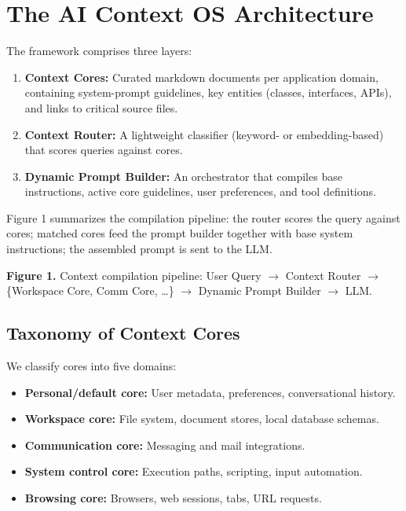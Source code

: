 \documentclass[11pt]{article}
\providecommand{\tightlist}{%
  \setlength{\itemsep}{2pt}%
  \setlength{\parskip}{0pt}%
}
\begin{document}
\section{The AI Context OS
Architecture}\label{the-ai-context-os-architecture}

The framework comprises three layers:

\begin{enumerate}
\def\labelenumi{\arabic{enumi}.}
\tightlist
\item
  \textbf{Context Cores:} Curated markdown documents per application
  domain, containing system-prompt guidelines, key entities (classes,
  interfaces, APIs), and links to critical source files.
\item
  \textbf{Context Router:} A lightweight classifier (keyword- or
  embedding-based) that scores queries against cores.
\item
  \textbf{Dynamic Prompt Builder:} An orchestrator that compiles base
  instructions, active core guidelines, user preferences, and tool
  definitions.
\end{enumerate}

Figure 1 summarizes the compilation pipeline: the router scores the
query against cores; matched cores feed the prompt builder together with
base system instructions; the assembled prompt is sent to the LLM.

\textbf{Figure 1.} Context compilation pipeline: User Query
\(\rightarrow\) Context Router \(\rightarrow\) \{Workspace Core, Comm
Core, \ldots\} \(\rightarrow\) Dynamic Prompt Builder \(\rightarrow\)
LLM.

\subsection{Taxonomy of Context Cores}\label{taxonomy-of-context-cores}

We classify cores into five domains:

\begin{itemize}
\tightlist
\item
  \textbf{Personal/default core:} User metadata, preferences,
  conversational history.
\item
  \textbf{Workspace core:} File system, document stores, local database
  schemas.
\item
  \textbf{Communication core:} Messaging and mail integrations.
\item
  \textbf{System control core:} Execution paths, scripting, input
  automation.
\item
  \textbf{Browsing core:} Browsers, web sessions, tabs, URL requests.
\end{itemize}
\end{document}
